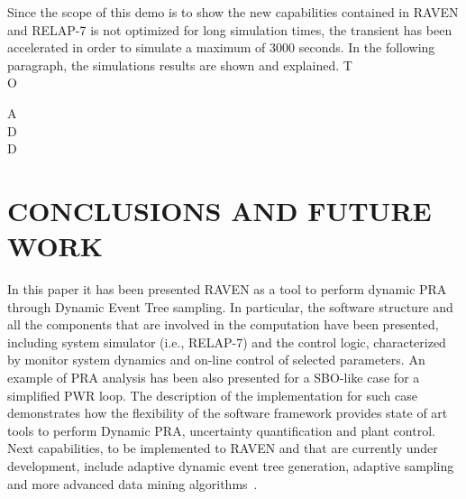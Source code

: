 \documentclass{mc2013}
\begin{document}
\vspace{-5mm}
Since the scope of this demo is to show the new capabilities contained in RAVEN and RELAP-7 is not optimized for long simulation times, the transient has been accelerated in order to simulate a maximum of 3000 seconds. 
In the following paragraph, the simulations results are shown and explained.
T
\\O

A
\\D
\\D
\section{CONCLUSIONS AND FUTURE WORK}
In this paper it has been presented RAVEN as a tool to perform dynamic PRA through Dynamic Event Tree sampling. In particular, the software structure and all the components that are involved in the computation have been presented, including system simulator (i.e., RELAP-7) and the control logic, characterized by monitor system dynamics and on-line control of selected parameters.
An example of PRA analysis has been also presented for a SBO-like case for a simplified PWR loop. 
The description of the implementation for such case demonstrates how the flexibility of the software framework provides state of art tools to perform Dynamic PRA, uncertainty quantification and plant control. 
Next capabilities, to be implemented to RAVEN and that are currently under development, include adaptive dynamic event tree generation, adaptive sampling~\cite{mandelliSVMANS} and more advanced data mining algorithms~\cite{mandelliEsrel2011}. 
\end{document}
